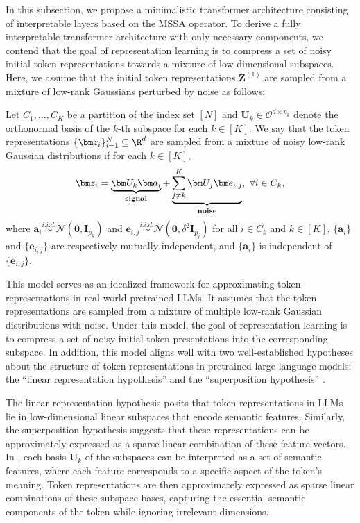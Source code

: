 \documentclass[../../book-main.tex]{subfiles}
\begin{document}
In this subsection, we propose a minimalistic transformer architecture consisting of interpretable layers based on the MSSA operator. To derive a fully interpretable transformer architecture with only necessary components,
we contend that the goal of representation learning is to compress a set of noisy initial token representations towards a mixture of low-dimensional subspaces. %
Here, we assume that the initial token representations $\bm Z^{(1)}$ are sampled from a mixture of low-rank Gaussians perturbed by noise as follows: 
\begin{definition}\label{def:MoG}
Let $C_1,\dots,C_K$ be a partition of the index set $[N]$ and $\bm U_k \in \mathcal{O}^{d \times p_k}$ denote the orthonormal basis of the $k$-th subspace for each $k \in [K]$. We say that the token representations $\{\bm z_i \}_{i=1}^N \subseteq \R^d$ are sampled from a mixture of noisy low-rank Gaussian distributions if for each $k \in [K]$,
\begin{align}\label{eq:MoG}
    \bm z_i = \underbrace{\bm U_{k} \bm a_i}_{\bf signal} + \underbrace{\sum_{j \neq k}^K \bm U_j \bm e_{i,j}}_{\bf noise},\ \forall i \in C_k, 
\end{align}
where $\bm{a}_i \overset{i.i.d.}{\sim} \mathcal{N}(\bm{0},\bm{I}_{p_k})$ and $\bm{e}_{i,j} \overset{i.i.d.}{\sim} \mathcal{N}(\bm{0},\delta^2\bm{I}_{p_j})$ for all $i \in C_k$ and $k \in [K]$, $\{\bm{a}_i\}$ and $\{\bm{e}_{i,j}\}$ are respectively mutually independent, and $\{\bm{a}_i\}$ is independent of $\{\bm{e}_{i,j}\}$.         
\end{definition}
This model serves as an idealized framework for approximating token representations in real-world pretrained LLMs. It assumes that the token representations are sampled from a mixture of multiple low-rank Gaussian distributions with noise. Under this model, the goal of representation learning is to compress a set of noisy initial token presentations into the corresponding subspace. In addition, this model aligns well with two well-established hypotheses about the structure of token representations in pretrained large language models: the ``linear representation hypothesis''  \citep{jiang2024origins,park2023linear} and the ``superposition hypothesis'' \citep{elhage2022toy,yun2021transformer}. 

\begin{remark}
    The linear representation hypothesis posits that token representations in LLMs lie in low-dimensional linear subspaces that encode semantic features. Similarly, the superposition hypothesis suggests that these representations can be approximately expressed as a sparse linear combination of these feature vectors. In , each basis $\bm U_k$ of the subspaces can be interpreted as a set of semantic features, where each feature corresponds to a specific aspect of the token's meaning. Token representations are then approximately expressed as sparse linear combinations of these subspace bases, capturing the essential semantic components of the token while ignoring irrelevant dimensions. 
\end{remark}
\end{document}
